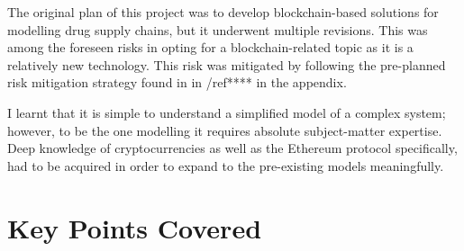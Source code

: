 The original plan of this project was to develop blockchain-based solutions for modelling drug supply chains, but it underwent multiple revisions. This was among the foreseen risks in opting for a blockchain-related topic as it is a relatively new technology. This risk was mitigated by following the pre-planned risk mitigation strategy found in in /ref**** in the appendix.

I learnt that it is simple to understand a simplified model of a complex system; however, to be the one modelling it requires absolute subject-matter expertise. Deep knowledge of cryptocurrencies as well as the Ethereum protocol specifically, had to be acquired in order to expand to the pre-existing models meaningfully. 

\section{Key Points Covered}
